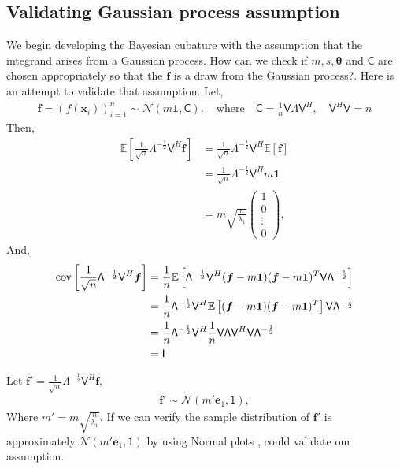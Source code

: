 \documentclass[twocolumn]{svjour3}          %
\newcommand{\bm}[1]{\boldsymbol{#1}}
\newcommand{\Ex}{\mathbb{E}}
\newcommand{\vtheta}{{\bm{\theta}}}
\newcommand{\vf}{\bm{f}}
\newcommand{\vx}{\bm{x}}
\newcommand{\vone}{\bm{1}}
\newcommand{\mC}{\mathsf{C}}
\newcommand{\cov}{{\textup{cov}}}
\newcommand{\mLambda}{\mathsf{\Lambda}}
\newcommand{\mV}{\mathsf{V}}
\newcommand{\calN}{\mathcal{N}}
\begin{document}
\subsection{Validating Gaussian process assumption}


We begin developing the Bayesian cubature with the assumption that the integrand arises from a Gaussian process. How can we check if $m, s, \vtheta$ and $\mC$ are chosen appropriately so that the $\vf$ is a draw from the Gaussian process?. Here is an attempt to validate that assumption. Let,
\begin{align*}
\vf = \left( f(\vx_i) \right)_{i=1}^n
\sim \calN \left( m\vone, \mC \right), 
\quad \text{where}\quad \mC = \frac 1n \mV \mLambda \mV^H, \quad \mV^H \mV = n
\end{align*}
Then,
\begin{align*}
\Ex\left[ \frac{1}{\sqrt{n}} \mLambda^{-\frac 12} \mV^H \vf \right]
& =
\frac{1}{\sqrt{n}} \mLambda^{-\frac 12} \mV^H \Ex[\vf] 
\\
& =
\frac{1}{\sqrt{n}} \mLambda^{-\frac 12} \mV^H m \vone
\\
& = m \sqrt{\frac{n}{\lambda_1}} \left( 
\begin{array}{c}
1 \\ 0 \\ \vdots \\ 0
\end{array}
\right),
\end{align*}
And,
\begin{align*}
\cov \left[ \frac{1}{\sqrt{n}} \mLambda^{-\frac 12} \mV^H \vf  \right]
&=
\frac{1}{n} \Ex\left[  
\mLambda^{-\frac 12} \mV^H (\vf - m \vone)
(\vf - m \vone)^T \mV \mLambda^{-\frac 12}
\right]
\\
&=
\frac{1}{n} \mLambda^{-\frac 12} \mV^H 
\Ex\left[ (\vf - m \vone)
(\vf - m \vone)^T \right] \mV \mLambda^{-\frac 12}
\\
&=
\frac{1}{n} \mLambda^{-\frac 12} \mV^H 
\frac 1n \mV \mLambda \mV^H \mV \mLambda^{-\frac 12}
\\
& = \mathsf{I}
\end{align*}

Let $\vf' = \frac{1}{\sqrt{n}} \mLambda^{-\frac 12} \mV^H \vf$,
\begin{align*}
\vf' \sim \calN \left( 
m' \bm{e}_1,
\mathsf{1}
\right),
\end{align*}
Where $m' = m \sqrt{\frac{n}{\lambda_1}} $.
If we can verify the sample distribution of $\vf'$ is approximately $\calN\left( m' \bm{e}_1, \mathsf{1} \right)$ by using Normal plots , could validate our assumption.
\end{document}
